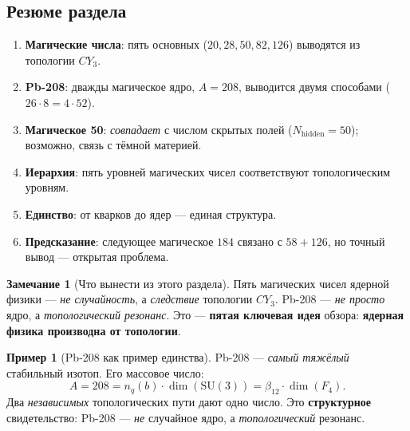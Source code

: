 \documentclass[11pt,a4paper]{article}
\newcommand{\SU}{\mathrm{SU}}
\newcommand{\CY}{CY_3}
\newcommand{\Nhidden}{N_{\text{hidden}}}
\theoremstyle{definition}
\newtheorem{remark}[theorem]{Замечание}
\newtheorem{example}[theorem]{Пример}
\begin{document}
\subsection{Резюме раздела}
\label{subsec:magic-summary}

\begin{enumerate}
    \item \textbf{Магические числа}: пять основных 
          ($20, 28, 50, 82, 126$) выводятся из топологии $\CY$.
    \item \textbf{Pb-208}: дважды магическое ядро, 
          $A = 208$, выводится двумя способами 
          ($26 \cdot 8 = 4 \cdot 52$).
    \item \textbf{Магическое 50}: \emph{совпадает} с числом 
          скрытых полей ($\Nhidden = 50$); возможно, связь 
          с тёмной материей.
    \item \textbf{Иерархия}: пять уровней магических чисел 
          соответствуют топологическим уровням.
    \item \textbf{Единство}: от кварков до ядер — единая 
          структура.
    \item \textbf{Предсказание}: следующее магическое $184$ 
          связано с $58 + 126$, но точный вывод — открытая 
          проблема.
\end{enumerate}

\begin{remark}[Что вынести из этого раздела]
\label{rem:magic-takeaway}
Пять магических чисел ядерной физики — \emph{не случайность}, 
а \emph{следствие} топологии $\CY$. Pb-208 — \emph{не просто} 
ядро, а \emph{топологический резонанс}. Это — 
\textbf{пятая ключевая идея} обзора: \textbf{ядерная физика 
производна от топологии}.
\end{remark}

\begin{example}[Pb-208 как пример единства]
\label{ex:pb208}
Pb-208 — \emph{самый тяжёлый} стабильный изотоп. Его массовое 
число:
\begin{equation}
    A = 208 = n_q(b) \cdot \dim(\SU(3)) 
    = \beta_{12} \cdot \dim(F_4).
\end{equation}
Два \emph{независимых} топологических пути дают одно число. 
Это \textbf{структурное} свидетельство: Pb-208 — \emph{не} 
случайное ядро, а \emph{топологический} резонанс.
\end{example}
\end{document}
